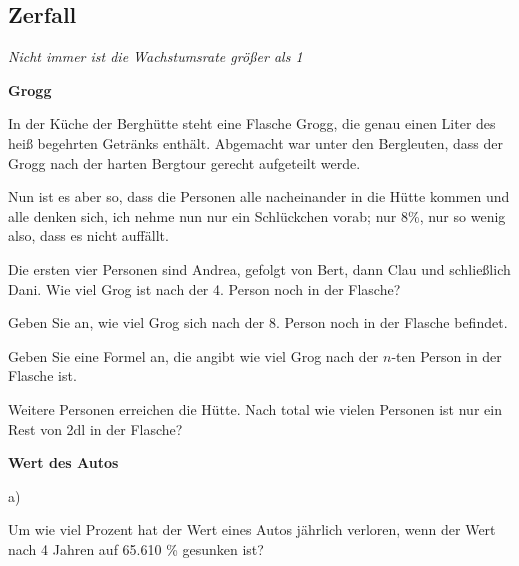 \subsection{Zerfall}
\textit{Nicht immer ist die Wachstumsrate größer als 1}


\bbwActAufgabenNr{} \textbf{Grogg}

In der Küche der Berghütte steht eine Flasche Grogg, die genau einen Liter des
heiß begehrten Getränks enthält. Abgemacht war unter den Bergleuten,
dass der Grogg nach der harten Bergtour gerecht aufgeteilt werde.

Nun ist es aber so, dass die Personen alle nacheinander in die Hütte
kommen und alle denken sich, ich nehme nun nur ein Schlückchen vorab; 
nur 8\%, nur so wenig also, dass es nicht auffällt.

\begin{bbwAufgabenBlock}

\item Die ersten vier Personen sind Andrea, gefolgt von Bert, dann
  Clau und schließlich Dani.
  Wie viel Grog ist nach der 4. Person noch in der Flasche?

\item Geben Sie an, wie viel Grog sich nach der 8. Person noch in der
  Flasche befindet.

\item Geben Sie eine Formel an, die angibt wie viel Grog nach der
  $n$-ten Person in der Flasche ist.
  
\item Weitere Personen erreichen die Hütte. Nach total wie vielen Personen
  ist nur ein Rest von 2dl in der Flasche?
\end{bbwAufgabenBlock}
\platzFuerBerechnungenBisEndeSeite{}


\bbwActAufgabenNr{} \textbf{Wert des Autos}

a)

Um wie viel Prozent hat der Wert eines Autos jährlich verloren, wenn
der Wert nach 4 Jahren auf 65.610 \% gesunken ist?

